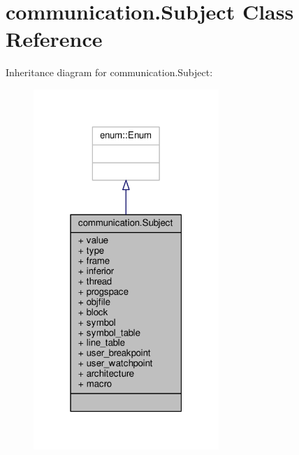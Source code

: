 \hypertarget{classcommunication_1_1Subject}{}\section{communication.\+Subject Class Reference}
\label{classcommunication_1_1Subject}


Inheritance diagram for communication.\+Subject\+:
\nopagebreak
\begin{figure}[H]
\begin{center}
\leavevmode
\includegraphics[width=199pt]{classcommunication_1_1Subject__inherit__graph}
\end{center}
\end{figure}


